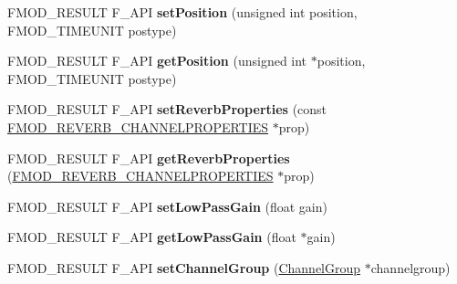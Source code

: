 \begin{DoxyCompactItemize}
\item 
\hypertarget{class_f_m_o_d_1_1_channel_a46f8f6738b500bbb995bd4a4ecce826f}{F\-M\-O\-D\-\_\-\-R\-E\-S\-U\-L\-T F\-\_\-\-A\-P\-I {\bfseries set\-Position} (unsigned int position, F\-M\-O\-D\-\_\-\-T\-I\-M\-E\-U\-N\-I\-T postype)}\label{class_f_m_o_d_1_1_channel_a46f8f6738b500bbb995bd4a4ecce826f}

\item 
\hypertarget{class_f_m_o_d_1_1_channel_a580cb740f80cf139faaf21181490d98f}{F\-M\-O\-D\-\_\-\-R\-E\-S\-U\-L\-T F\-\_\-\-A\-P\-I {\bfseries get\-Position} (unsigned int $\ast$position, F\-M\-O\-D\-\_\-\-T\-I\-M\-E\-U\-N\-I\-T postype)}\label{class_f_m_o_d_1_1_channel_a580cb740f80cf139faaf21181490d98f}

\item 
\hypertarget{class_f_m_o_d_1_1_channel_a1002a2ff8f7f9f33b2fce03fb472e8a8}{F\-M\-O\-D\-\_\-\-R\-E\-S\-U\-L\-T F\-\_\-\-A\-P\-I {\bfseries set\-Reverb\-Properties} (const \hyperlink{struct_f_m_o_d___r_e_v_e_r_b___c_h_a_n_n_e_l_p_r_o_p_e_r_t_i_e_s}{F\-M\-O\-D\-\_\-\-R\-E\-V\-E\-R\-B\-\_\-\-C\-H\-A\-N\-N\-E\-L\-P\-R\-O\-P\-E\-R\-T\-I\-E\-S} $\ast$prop)}\label{class_f_m_o_d_1_1_channel_a1002a2ff8f7f9f33b2fce03fb472e8a8}

\item 
\hypertarget{class_f_m_o_d_1_1_channel_a0e0e479c81abd5e709bda6abcebac57b}{F\-M\-O\-D\-\_\-\-R\-E\-S\-U\-L\-T F\-\_\-\-A\-P\-I {\bfseries get\-Reverb\-Properties} (\hyperlink{struct_f_m_o_d___r_e_v_e_r_b___c_h_a_n_n_e_l_p_r_o_p_e_r_t_i_e_s}{F\-M\-O\-D\-\_\-\-R\-E\-V\-E\-R\-B\-\_\-\-C\-H\-A\-N\-N\-E\-L\-P\-R\-O\-P\-E\-R\-T\-I\-E\-S} $\ast$prop)}\label{class_f_m_o_d_1_1_channel_a0e0e479c81abd5e709bda6abcebac57b}

\item 
\hypertarget{class_f_m_o_d_1_1_channel_a10e6a2fe8768461407fac5963167c416}{F\-M\-O\-D\-\_\-\-R\-E\-S\-U\-L\-T F\-\_\-\-A\-P\-I {\bfseries set\-Low\-Pass\-Gain} (float gain)}\label{class_f_m_o_d_1_1_channel_a10e6a2fe8768461407fac5963167c416}

\item 
\hypertarget{class_f_m_o_d_1_1_channel_a0e34960ec8bd9703fcdcfa0b85683b18}{F\-M\-O\-D\-\_\-\-R\-E\-S\-U\-L\-T F\-\_\-\-A\-P\-I {\bfseries get\-Low\-Pass\-Gain} (float $\ast$gain)}\label{class_f_m_o_d_1_1_channel_a0e34960ec8bd9703fcdcfa0b85683b18}

\item 
\hypertarget{class_f_m_o_d_1_1_channel_a570b83eb8178325a131b081a8d5ffd81}{F\-M\-O\-D\-\_\-\-R\-E\-S\-U\-L\-T F\-\_\-\-A\-P\-I {\bfseries set\-Channel\-Group} (\hyperlink{class_f_m_o_d_1_1_channel_group}{Channel\-Group} $\ast$channelgroup)}\label{class_f_m_o_d_1_1_channel_a570b83eb8178325a131b081a8d5ffd81}


\end{DoxyCompactItemize}

